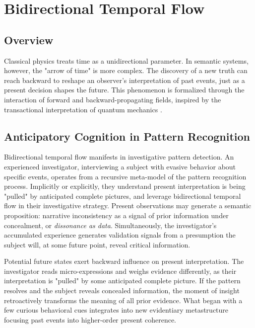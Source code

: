 \chapter{Bidirectional Temporal Flow}

\section{Overview}

Classical physics treats time as a unidirectional parameter. In semantic systems, however, the "arrow of time" is more complex. The discovery of a new truth can reach backward to reshape an observer's interpretation of past events, just as a present decision shapes the future. This phenomenon is formalized through the interaction of forward and backward-propagating fields, inspired by the transactional interpretation of quantum mechanics \autocite{Cramer1986}.

\section{Anticipatory Cognition in Pattern Recognition}

Bidirectional temporal flow manifests in investigative pattern detection. An experienced investigator, interviewing a subject with evasive behavior about specific events, operates from a recursive meta-model of the pattern recognition process. Implicitly or explicitly, they understand present interpretation is being "pulled" by anticipated complete pictures, and leverage bidirectional temporal flow in their investigative strategy. Present observations may generate a semantic proposition: narrative inconsistency as a signal of prior information under concealment, or \textit{dissonance as data}. Simultaneously, the investigator's accumulated experience generates validation signals from a presumption the subject will, at some future point, reveal critical information.

Potential future states exert backward influence on present interpretation. The investigator reads micro-expressions and weighs evidence differently, as their interpretation is "pulled" by some anticipated complete picture. If the pattern resolves and the subject reveals concealed information, the moment of insight retroactively transforms the meaning of all prior evidence. What began with a few curious behavioral cues integrates into new evidentiary metastructure focusing past events into higher-order present coherence.


